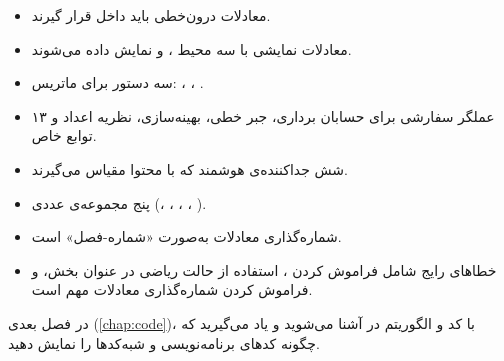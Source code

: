 \begin{itemize}
    \item معادلات درون‌خطی باید داخل 
    قرار گیرند.

    \item معادلات نمایشی با سه محیط
    ،  و 
    نمایش داده می‌شوند.

    \item سه دستور برای ماتریس:
    ، ، .

    \item ۱۳ عملگر سفارشی برای حسابان برداری،
    جبر خطی، بهینه‌سازی، نظریه اعداد و توابع
    خاص.

    \item شش جداکننده‌ی هوشمند که با محتوا
    مقیاس می‌گیرند.

    \item پنج مجموعه‌ی عددی (\lr{$\N$}،
    \lr{$\Z$}، \lr{$\Q$}، \lr{$\R$}، \lr{$\C$}).

    \item شماره‌گذاری معادلات به‌صورت
    «شماره-فصل» است.

    \item خطاهای رایج شامل فراموش کردن
    ، استفاده از حالت ریاضی در
    عنوان بخش، و فراموش کردن شماره‌گذاری
    معادلات مهم است.
\end{itemize}

در فصل بعدی (\cref{chap:code})، با کد و
الگوریتم در  آشنا می‌شوید و
یاد می‌گیرید که چگونه کدهای برنامه‌نویسی
و شبه‌کدها را نمایش دهید.
